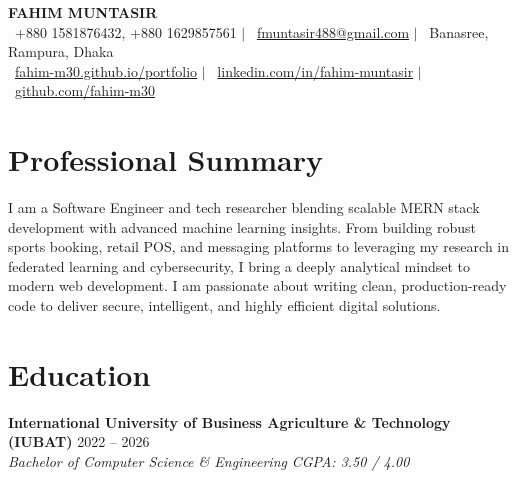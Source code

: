 \documentclass[11pt,letterpaper]{article}
\begin{document}
\begin{center}
    {\fontsize{24}{28}\selectfont \textbf{FAHIM MUNTASIR}} \\ \vspace{6pt}
    \small
    \faPhone\ +880 1581876432, +880 1629857561 \hspace{7pt} $|$ \hspace{7pt}
    \faEnvelope\ \href{mailto:fmuntasir488@gmail.com}{fmuntasir488@gmail.com} \hspace{7pt} $|$ \hspace{7pt}
    \faMapMarker*\ Banasree, Rampura, Dhaka \\ \vspace{4pt}
    \faGlobe\ \href{https://fahim-m30.github.io/portfolio/}{fahim-m30.github.io/portfolio} \hspace{7pt} $|$ \hspace{7pt}
    \faLinkedin\ \href{https://www.linkedin.com/in/fahim-muntasir-086b0b26b}{linkedin.com/in/fahim-muntasir} \hspace{7pt} $|$ \hspace{7pt}
    \faGithub\ \href{https://github.com/fahim-m30}{github.com/fahim-m30}
\end{center}
\vspace{4pt}

\section*{Professional Summary}
I am a Software Engineer and tech researcher blending scalable MERN stack development with advanced machine learning insights. From building robust sports booking, retail POS, and messaging platforms to leveraging my research in federated learning and cybersecurity, I bring a deeply analytical mindset to modern web development. I am passionate about writing clean, production-ready code to deliver secure, intelligent, and highly efficient digital solutions.

\section*{Education}
\noindent
\textbf{International University of Business Agriculture \& Technology (IUBAT)} \hfill 2022 -- 2026 \\
\textit{Bachelor of Computer Science \& Engineering} \hfill \textit{CGPA: 3.50 / 4.00}
\end{document}

